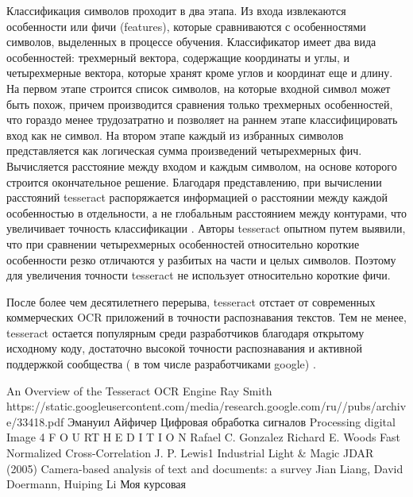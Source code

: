 \documentclass[oneside,final,14pt]{extreport}
\begin{document}
Классификация символов проходит в два этапа. Из входа извлекаются особенности или фичи (features), которые сравниваются с особенностями символов, выделенных в процессе обучения. Классификатор имеет два вида особенностей: трехмерный вектора, содержащие координаты и углы, и четырехмерные вектора, которые хранят кроме углов и координат еще и длину. На первом этапе строится список символов, на которые входной символ может быть похож, причем производится сравнения только трехмерных особенностей, что гораздо менее трудозатратно и позволяет  на раннем этапе классифицировать вход как не символ. На втором этапе каждый из избранных символов представляется как логическая сумма произведений четырехмерных фич. Вычисляется расстояние между входом и каждым символом, на основе которого строится окончательное решение. Благодаря представлению, при вычислении расстояний tesseract распоряжается информацией о расстоянии между каждой особенностью в отдельности, а не глобальным расстоянием между контурами, что увеличивает точность классификации .  Авторы tesseract опытном путем выявили, что при сравнении четырехмерных особенностей относительно короткие особенности резко отличаются у разбитых на части и целых символов. Поэтому для увеличения точности tesseract не использует относительно короткие фичи. 

После более чем десятилетнего перерыва, tesseract отстает от современных коммерческих OCR приложений в точности распознавания текстов. Тем не менее, tesseract остается популярным среди разработчиков благодаря открытому исходному коду, достаточно высокой точности распознавания и активной поддержкой сообщества ( в том числе разработчиками google) . 

\newpage
\begin{thebibliography}{0}
An Overview of the Tesseract OCR Engine ﻿Ray Smith
https://static.googleusercontent.com/media/research.google.com/ru//pubs/archive/33418.pdf
Эмануил Айфичер Цифровая обработка сигналов
 Processing digital Image 4 F O U RT H E D I T I O N Rafael C. Gonzalez Richard E. Woods
 Fast Normalized Cross-Correlation J. P. Lewis1 Industrial Light \& Magic
\bibitem JDAR (2005)
﻿Camera-based analysis of text and documents: a survey
Jian Liang, David Doermann, Huiping Li
 Моя курсовая
\end{thebibliography}
\end{document}
